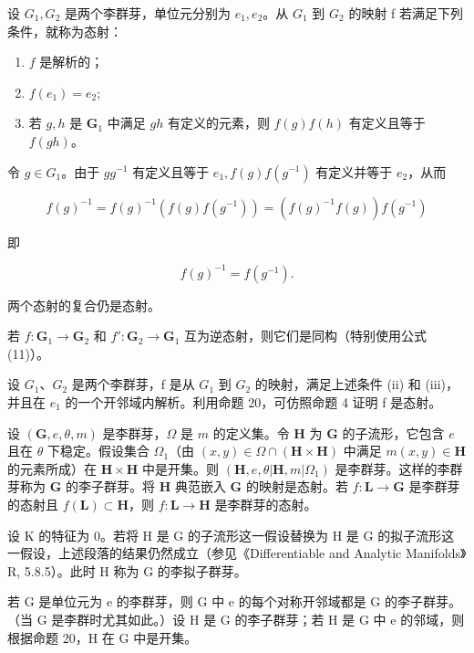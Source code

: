 设 \(G_{1}, G_{2}\) 是两个李群芽，单位元分别为 \(e_{1}, e_{2}\)。从 \(G_{1}\) 到 \(G_{2}\) 的映射 f 若满足下列条件，就称为态射：

\begin{enumerate}
\def\labelenumi{(\roman{enumi})}
\item
  \(f\) 是解析的；
\item
  \(f(e_{1}) = e_{2};\)
\item
  若 \(g, h\) 是 \(\mathbf{G}_1\) 中满足 \(gh\) 有定义的元素，则 \(f(g)f(h)\) 有定义且等于 \(f(gh)\)。
\end{enumerate}

令 \(g \in G_1\)。由于 \(gg^{-1}\) 有定义且等于 \(e_1, f(g)f(g^{-1})\) 有定义并等于 \(e_2\)，从而

\[
f (g) ^ {- 1} = f (g) ^ {- 1} \left(f (g) f \left(g ^ {- 1}\right)\right) = \left(f (g) ^ {- 1} f (g)\right) f \left(g ^ {- 1}\right)
\]

即

\[
f (g) ^ {- 1} = f (g ^ {- 1}).\tag{11}
\]

两个态射的复合仍是态射。

若 \(f: \mathbf{G}_1 \to \mathbf{G}_2\) 和 \(f': \mathbf{G}_2 \to \mathbf{G}_1\) 互为逆态射，则它们是同构（特别使用公式 (11)）。

设 \(G_{1}\)、\(G_{2}\) 是两个李群芽，f 是从 \(G_{1}\) 到 \(G_{2}\) 的映射，满足上述条件 (ii) 和 (iii)，并且在 \(e_{1}\) 的一个开邻域内解析。利用命题 20，可仿照命题 4 证明 f 是态射。

设 \((\mathbf{G}, e, \theta, m)\) 是李群芽，\(\Omega\) 是 \(m\) 的定义集。令 \(\mathbf{H}\) 为 \(\mathbf{G}\) 的子流形，它包含 \(e\) 且在 \(\theta\) 下稳定。假设集合 \(\Omega_1\)（由 \((x, y) \in \Omega \cap (\mathbf{H} \times \mathbf{H})\) 中满足 \(m(x, y) \in \mathbf{H}\) 的元素所成）在 \(\mathbf{H} \times \mathbf{H}\) 中是开集。则 \((\mathbf{H}, e, \theta | \mathbf{H}, m | \Omega_1)\) 是李群芽。这样的李群芽称为 \(\mathbf{G}\) 的李子群芽。将 \(\mathbf{H}\) 典范嵌入 \(\mathbf{G}\) 的映射是态射。若 \(f: \mathbf{L} \to \mathbf{G}\) 是李群芽的态射且 \(f(\mathbf{L}) \subset \mathbf{H}\)，则 \(f: \mathbf{L} \to \mathbf{H}\) 是李群芽的态射。

设 K 的特征为 0。若将 H 是 G 的子流形这一假设替换为 H 是 G 的拟子流形这一假设，上述段落的结果仍然成立（参见《Differentiable and Analytic Manifolds》R, 5.8.5）。此时 H 称为 G 的李拟子群芽。

若 G 是单位元为 e 的李群芽，则 G 中 e 的每个对称开邻域都是 G 的李子群芽。（当 G 是李群时尤其如此。）设 H 是 G 的李子群芽；若 H 是 G 中 e 的邻域，则根据命题 20，H 在 G 中是开集。


